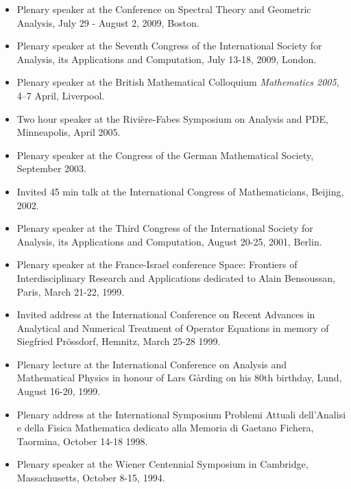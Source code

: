 \documentclass{article}
\begin{document}
\begin{itemize}
\item Plenary speaker at the Conference on Spectral Theory and Geometric Analysis, July 29 - August 2, 2009, Boston.
\item Plenary speaker at the Seventh Congress of the International Society for Analysis, its Applications and Computation, July 13-18, 2009, London.
\item Plenary speaker at the British Mathematical Colloquium {\it Mathematics 2005}, 4--7 April, Liverpool.
\item Two hour speaker at the Rivi\`ere-Fabes Symposium on Analysis and PDE, Minneapolis, April 2005.
\item Plenary speaker at the Congress of the German Mathematical Society, September 2003.
       \item Invited 45 min talk at the
              {International Congress of Mathematicians}, Beijing, 2002.
\item Plenary speaker at the Third Congress of the International Society for Analysis, its Applications and Computation, August 20-25, 2001, Berlin.
 \item Plenary
speaker at the France-Israel 
  conference 
       {Space: Frontiers of Interdisciplinary Research and Applications} 
 dedicated to Alain Bensoussan, Paris, March 21-22, 1999.  
       \item Invited address
at the 
  {International Conference on Recent Advances in Analytical and Numerical Treatment 
  of Operator Equations in memory of Siegfried Pr{\"o}ssdorf}, Hemnitz, March 25-28 1999.

       \item  Plenary
lecture at the 
     {International Conference on Analysis and Mathematical
Physics in honour of Lars G{\aa}rding on his 80th birthday}, Lund, August 16-20, 1999.        
\item  Plenary 
address at the International 
  Symposium Problemi Attuali dell'Analisi e
della Fisica Mathematica 
  dedicato alla Memoria di Gaetano Fichera, Taormina, October 14-18 1998.
       \item Plenary speaker 
 at the Wiener 
  Centennial Symposium in Cambridge,
Massachusetts, October 8-15, 1994. 
\end{itemize}

\end{document}
